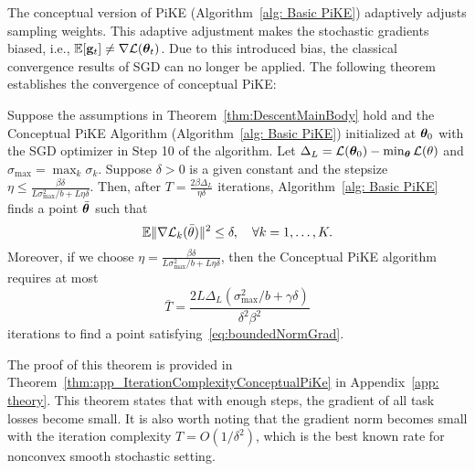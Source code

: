The conceptual version of PiKE (Algorithm~\ref{alg: Basic PiKE}) adaptively adjusts sampling weights. This adaptive adjustment makes the stochastic gradients biased, i.e., $\mathbb{E} [\mathbf{g}_t] \neq \nabla \mathcal{L}(\bm{\theta}_t)$. Due to this introduced bias, the classical convergence results of SGD can no longer be applied. The following theorem establishes the convergence of  conceptual PiKE:


\begin{theorem}%
\label{thm:IterationComplexityConceptualPiKe}
Suppose the assumptions in Theorem~\ref{thm:DescentMainBody} hold and the Conceptual PiKE Algorithm (Algorithm~\ref{alg: Basic PiKE}) initialized at $\bm{\theta}_0$ with the SGD optimizer in Step 10 of the algorithm. Let $\Delta_L = \mathcal{L}(\bm{\theta}_0) - \min_{\bm{\theta}}\mathcal{L}(\theta)$ and $\sigma_{\max} = \max_k \sigma_k$. Suppose $\delta>0$ is a given constant and the stepsize $\eta \leq \frac{\beta \delta}{L\sigma_{\max}^2/b + L\eta \delta}$. Then, after $T = \frac{2\beta \Delta_L}{\eta \delta}$ iterations, Algorithm~\ref{alg: Basic PiKE} finds a point $\bar{\bm{\theta}}$ such that 
\begin{equation}
    \label{eq:boundedNormGrad}
    \mathbb{E} \|\nabla \mathcal{L}_k(\bar{\theta})\|^2 \leq \delta,\quad \forall k=1,\ldots, K.
\end{equation}
Moreover, if we choose $\eta = \frac{\beta \delta}{L\sigma_{\max}^2/b + L\eta \delta}$, then the Conceptual PiKE algorithm requires at most 
\[
\bar{T} = \frac{2L\Delta_L(\sigma_{\max}^2/b + \gamma \delta)}{\delta^2 \beta^2}
\]
iterations to find a point satisfying~\eqref{eq:boundedNormGrad}.
\end{theorem}

 The proof of this theorem is provided in Theorem~\ref{thm:app_IterationComplexityConceptualPiKe}  in Appendix~\ref{app: theory}.
This theorem states that with enough steps, the gradient of all task losses become small. It is also worth noting that the gradient norm becomes small with the iteration complexity $T=O(1/\delta^2)$, which is the best known rate for nonconvex smooth stochastic setting. 





%
%
%
%
%
%
%


%
%

%

%
%


%

%


%
%
%
%
%
%
%
%
%




